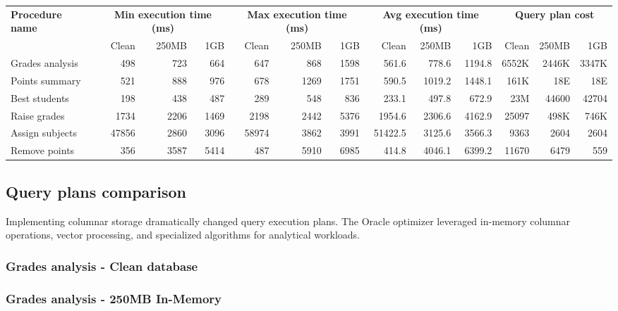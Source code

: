 \begin{table}[htb]
    \centering
    \begin{tabular}{|l||r|r|r||r|r|r||r|r|r||r|r|r|}
        \hline
        \multirow{2}{*}{\textbf{Procedure name}} & \multicolumn{3}{c||}{\textbf{Min execution time (ms)}} & \multicolumn{3}{c||}{\textbf{Max execution time (ms)}} & \multicolumn{3}{c||}{\textbf{Avg execution time (ms)}} & \multicolumn{3}{c|}{\textbf{Query plan cost}} \\
         & Clean & 250MB & 1GB & Clean & 250MB & 1GB & Clean & 250MB & 1GB & Clean & 250MB & 1GB \\
        \hline
        Grades analysis & 498 & 723 & 664 & 647 & 868 & 1598 & 561.6 & 778.6 & 1194.8 & 6552K & 2446K & 3347K \\
        Points summary  & 521 & 888 & 976 & 678 & 1269 & 1751 & 590.5 & 1019.2 & 1448.1 & 161K & 18E & 18E \\
        Best students   & 198 & 438 & 487 & 289 & 548 & 836 & 233.1 & 497.8 & 672.9 & 23M & 44600 & 42704 \\
        Raise grades    & 1734 & 2206 & 1469 & 2198 & 2442 & 5376 & 1954.6 & 2306.6 & 4162.9 & 25097 & 498K & 746K \\
        Assign subjects & 47856 & 2860 & 3096 & 58974 & 3862 & 3991 & 51422.5 & 3125.6 & 3566.3 & 9363 & 2604 & 2604 \\
        Remove points   & 356 & 3587 & 5414 & 487 & 5910 & 6985 & 414.8 & 4046.1 & 6399.2 & 11670 & 6479 & 559 \\
        \hline
    \end{tabular}
\end{table}

\subsection{Query plans comparison}

Implementing columnar storage dramatically changed query execution plans. The Oracle optimizer leveraged in-memory columnar operations, vector processing, and specialized algorithms for analytical workloads.

\clearpage
\begin{multicols}{2}

    \subsubsection{Grades analysis - Clean database}
    \vfill\null
    \columnbreak

    \subsubsection{Grades analysis - 250MB In-Memory}
    \vfill\null
\end{multicols}

